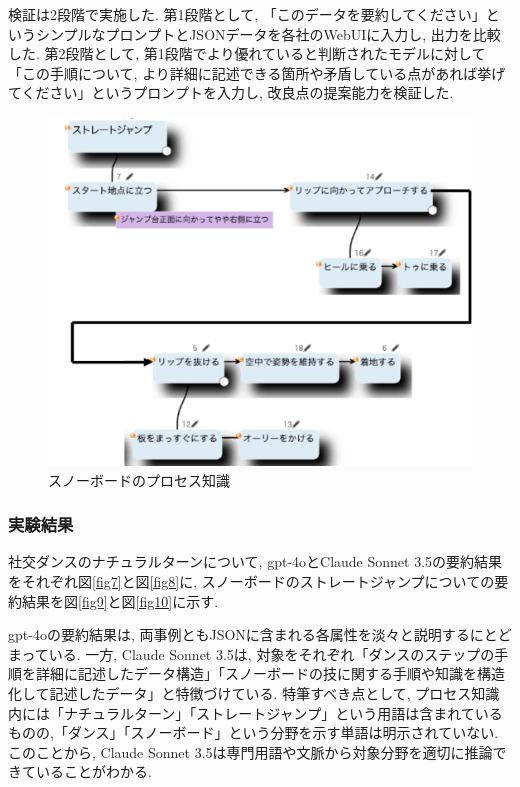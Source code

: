 検証は2段階で実施した. 第1段階として, 「このデータを要約してください」というシンプルなプロンプトとJSONデータを各社のWebUIに入力し, 出力を比較した. 第2段階として, 第1段階でより優れていると判断されたモデルに対して「この手順について, より詳細に記述できる箇所や矛盾している点があれば挙げてください」というプロンプトを入力し, 改良点の提案能力を検証した.

\begin{figure}[htbp]
    \centering
    \includegraphics[width=1.0\linewidth]{./image/charm_straight_jump_2.png}
    \caption{スノーボードのプロセス知識}
    \label{fig6}
\end{figure}


\subsubsection{実験結果}
社交ダンスのナチュラルターンについて, gpt-4oとClaude Sonnet 3.5の要約結果をそれぞれ図\ref{fig7}と図\ref{fig8}に, スノーボードのストレートジャンプについての要約結果を図\ref{fig9}と図\ref{fig10}に示す.

gpt-4oの要約結果は, 両事例ともJSONに含まれる各属性を淡々と説明するにとどまっている. 一方, Claude Sonnet 3.5は, 対象をそれぞれ「ダンスのステップの手順を詳細に記述したデータ構造」「スノーボードの技に関する手順や知識を構造化して記述したデータ」と特徴づけている. 特筆すべき点として, プロセス知識内には「ナチュラルターン」「ストレートジャンプ」という用語は含まれているものの,「ダンス」「スノーボード」という分野を示す単語は明示されていない. このことから, Claude Sonnet 3.5は専門用語や文脈から対象分野を適切に推論できていることがわかる.

